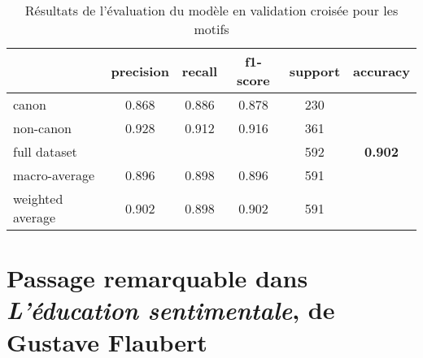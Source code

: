 	\begin{table}[ht]
		\centering %
		\begin{tabular}{l c c c c c}
			\toprule
    			 & precision & recall & f1-score & support & accuracy \\
			\toprule
			canon & 0.868 & 0.886 & 0.878 & 230 \\
			\midrule
			non-canon & 0.928 & 0.912 & 0.916 & 361 \\
			\midrule
			full dataset & & & & 592 & \textbf{0.902}\\
			\midrule
			macro-average & 0.896 & 0.898 & 0.896 & 591 \\
			\midrule
			weighted average & 0.902 & 0.898 & 0.902 & 591 \\

			\bottomrule
		\end{tabular}
	\caption{Résultats de l'évaluation du modèle en validation croisée pour les motifs}
	\end{table} 


\newpage 
\section{Passage remarquable dans \textit{L'éducation sentimentale}, de Gustave Flaubert}\label{eds}

